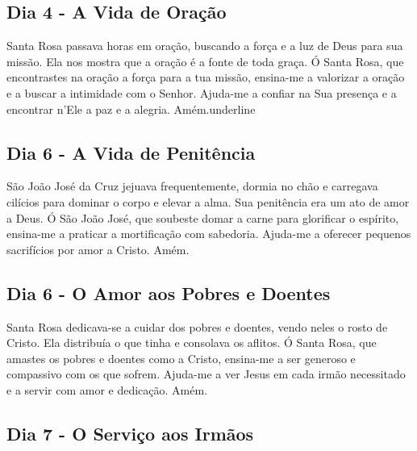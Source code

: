 \documentclass[a4paper,14pt]{extarticle} \usepackage[utf8]{inputenc}
\begin{document}
\underline{}

\subsection{Dia 4 - A Vida de Oração}


\underline{}

Santa Rosa passava horas em oração, buscando a força e a luz de Deus para sua missão. Ela nos mostra que a oração é a fonte de toda graça.
Ó Santa Rosa, que encontrastes na oração a força para a tua missão, ensina-me a valorizar a oração e a buscar a intimidade com o Senhor. Ajuda-me a confiar na Sua presença e a encontrar n’Ele a paz e a alegria. Amém.underline{}

\underline{}

\subsection{Dia 6 - A Vida de Penitência}

\underline{}

São João José da Cruz jejuava frequentemente, dormia no chão e carregava cilícios para dominar o corpo e elevar a alma. Sua penitência era um ato de amor a Deus.
Ó São João José, que soubeste domar a carne para glorificar o espírito, ensina-me a praticar a mortificação com sabedoria. Ajuda-me a oferecer pequenos sacrifícios por amor a Cristo. Amém.


\underline{}


\subsection{Dia 6 - O Amor aos Pobres e Doentes}


\underline{}

Santa Rosa dedicava-se a cuidar dos pobres e doentes, vendo neles o rosto de Cristo. Ela distribuía o que tinha e consolava os aflitos.
Ó Santa Rosa, que amastes os pobres e doentes como a Cristo, ensina-me a ser generoso e compassivo com os que sofrem. Ajuda-me a ver Jesus em cada irmão necessitado e a servir com amor e dedicação. Amém.


\underline{}

\subsection{Dia 7 - O Serviço aos Irmãos}
\end{document}
